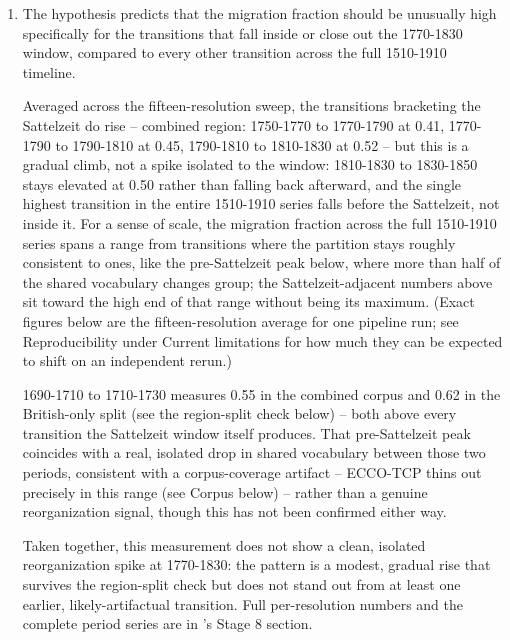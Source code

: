 \documentclass[11pt]{article}
\begin{document}
\begin{enumerate}
  \item {} The hypothesis predicts that the migration fraction
    should be unusually high specifically for the transitions that fall
    inside or close out the 1770-1830 window, compared to every other
    transition across the full 1510-1910 timeline.

    \begin{claimbox}
     Averaged across the fifteen-resolution sweep,
    the transitions bracketing the Sattelzeit do rise -- combined
    region: 1750-1770 to 1770-1790 at 0.41, 1770-1790 to 1790-1810 at
    0.45, 1790-1810 to 1810-1830 at 0.52 -- but this is a gradual
    climb, not a spike isolated to the window: 1810-1830 to 1830-1850
    stays elevated at 0.50 rather than falling back afterward, and the
    single highest transition in the entire 1510-1910 series falls
    before the Sattelzeit, not inside it. For a sense of scale, the
    migration fraction across the full 1510-1910 series spans a range
    from transitions where the partition stays roughly consistent to
    ones, like the pre-Sattelzeit peak below, where more than half of
    the shared vocabulary changes group; the Sattelzeit-adjacent numbers
    above sit toward the high end of that range without being its
    maximum. (Exact figures below are the fifteen-resolution average
    for one pipeline run; see Reproducibility under Current limitations
    for how much they can be expected to shift on an independent
    rerun.)

    1690-1710 to 1710-1730 measures 0.55 in the combined corpus and 0.62
    in the British-only split (see the region-split check below) --
    both above every transition the Sattelzeit window itself produces.
    That pre-Sattelzeit peak coincides with a real, isolated drop in
    shared vocabulary between those two periods, consistent with a
    corpus-coverage artifact -- ECCO-TCP thins out precisely in this
    range (see Corpus below) -- rather than a genuine reorganization
    signal, though this has not been confirmed either way.

    Taken together, this measurement does not show a clean, isolated
    reorganization spike at 1770-1830: the pattern is a modest, gradual
    rise that survives the region-split check but does not stand out
    from at least one earlier, likely-artifactual transition. Full
    per-resolution numbers and the complete period series are in
    's Stage 8 section.
    \end{claimbox}


\end{enumerate}
\end{document}
